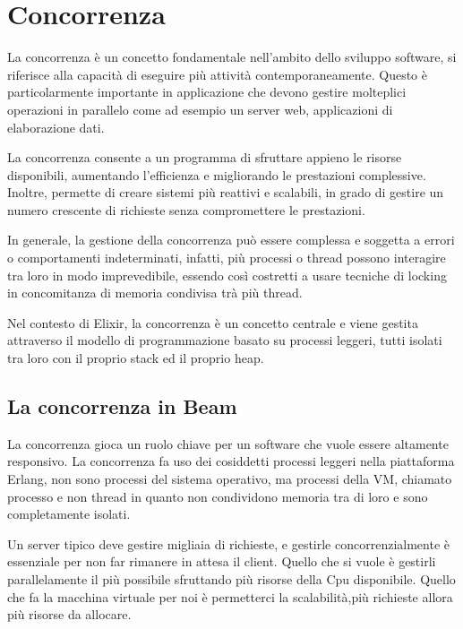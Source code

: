 \section{Concorrenza}

La concorrenza è un concetto fondamentale nell'ambito
dello sviluppo software, si riferisce alla capacità
di eseguire più attività contemporaneamente.
Questo è particolarmente importante in applicazione
che devono gestire molteplici operazioni in parallelo
come ad esempio un server web, applicazioni di
elaborazione dati.

La concorrenza consente a un programma di sfruttare appieno
le risorse disponibili, aumentando l'efficienza e migliorando
le prestazioni complessive.
Inoltre, permette di creare sistemi più reattivi e
scalabili, in grado di gestire un numero crescente di
richieste senza compromettere le prestazioni.

In generale, la gestione della concorrenza può essere complessa
e soggetta a errori o comportamenti indeterminati, infatti,
più processi o thread possono interagire tra loro in modo
imprevedibile, essendo così costretti a usare tecniche di
locking in concomitanza di memoria condivisa trà più thread.

Nel contesto di Elixir, la concorrenza è un concetto centrale
e viene gestita attraverso il modello di programmazione
basato su processi leggeri, tutti isolati tra loro con il proprio
stack ed il proprio heap.


\subsection{La concorrenza in Beam}

La concorrenza gioca un ruolo chiave per un software
che vuole essere altamente responsivo.
La concorrenza fa uso dei cosiddetti processi leggeri
nella piattaforma Erlang, non sono processi del 
sistema operativo, ma processi della
VM, chiamato processo e non thread in quanto non
condividono memoria tra di loro e sono completamente
isolati.

Un server tipico deve gestire migliaia di richieste, e
gestirle concorrenzialmente è essenziale per non far
rimanere in attesa il client. Quello che si vuole è
gestirli parallelamente il più possibile sfruttando
più risorse della Cpu disponibile.
Quello che fa la macchina virtuale per noi è permetterci
la scalabilità,più richieste allora più risorse da allocare.

